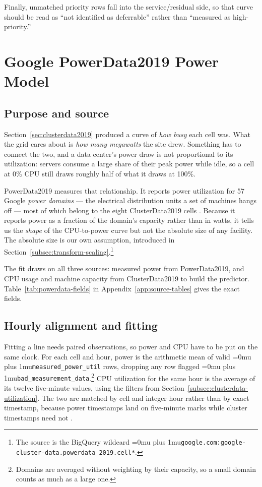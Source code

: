 ﻿\documentclass[12pt]{article}
\newcommand{\codepath}[1]{{\Urlmuskip=0mu plus 1mu\relax\nolinkurl{#1}}}
\begin{document}
Finally, unmatched priority rows fall into the service/residual side, so that
curve should be read as ``not identified as deferrable'' rather than ``measured
as high-priority.''

\section{Google PowerData2019 Power Model}
\label{sec:powerdata2019}

\subsection{Purpose and source}
\label{subsec:powerdata-purpose}

Section~\ref{sec:clusterdata2019} produced a curve of \emph{how busy} each cell
was. What the grid cares about is \emph{how many megawatts} the site drew.
Something has to connect the two, and a data center's power draw is not
proportional to its utilization: servers consume a large share of their peak
power while idle, so a cell at 0\% CPU still draws roughly half of what it
draws at 100\%.

PowerData2019 measures that relationship. It reports power utilization for 57
Google \emph{power domains} --- the electrical distribution units a set of
machines hangs off --- most of which belong to the eight ClusterData2019 cells
\cite{googlePowerData2019}. Because it reports power as a fraction of the
domain's capacity rather than in watts, it tells us the \emph{shape} of the
CPU-to-power curve but not the absolute size of any facility. The absolute size
is our own assumption, introduced in
Section~\ref{subsec:transform-scaling}.\footnote{The source is the BigQuery
wildcard \codepath{google.com:google-cluster-data.powerdata_2019.cell*}.}

The fit draws on all three sources: measured power from PowerData2019, and CPU
usage and machine capacity from ClusterData2019 to build the predictor.
Table~\ref{tab:powerdata-fields} in Appendix~\ref{app:source-tables} gives the
exact fields.

\subsection{Hourly alignment and fitting}
\label{subsec:powerdata-fitting}

Fitting a line needs paired observations, so power and CPU have to be put on
the same clock. For each cell and hour, power is the arithmetic mean of valid
\codepath{measured_power_util} rows, dropping any row flagged
\codepath{bad_measurement_data}.\footnote{Domains are averaged without weighting
by their capacity, so a small domain counts as much as a large one.} CPU
utilization for the same hour is the average of its twelve five-minute values,
using the filters from Section~\ref{subsec:clusterdata-utilization}. The two are
matched by cell and integer hour rather than by exact timestamp, because power
timestamps land on five-minute marks while cluster timestamps need not
\cite{googlePowerAnalysisColab}.
\end{document}
